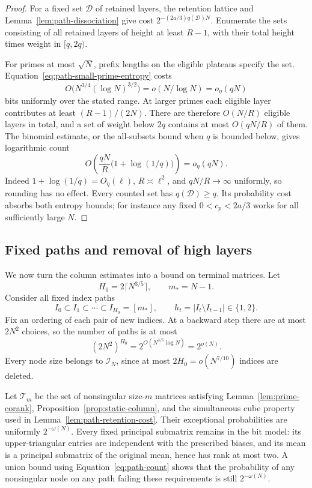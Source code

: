 \begin{proof}
For a fixed set \(\mathcal D\) of retained layers, the retention
lattice and Lemma~\ref{lem:path-dissociation} give cost
\(2^{-(2a/3)q(\mathcal D)N}\). Enumerate the sets consisting of
all retained layers of height at least \(R-1\), with their total
height times weight in \([q,2q)\).

For primes at most \(\sqrt N\), prefix lengths on the eligible
plateaus specify the set. Equation~\eqref{eq:path-small-prime-entropy}
costs
\[
 O\bigl(N^{3/4}(\log N)^{3/2}\bigr)
       =o(N/\log N)=o_\eta(qN)
\]
bits uniformly over the stated range. At larger primes each eligible
layer contributes at least \((R-1)/(2N)\). There are therefore
\(O(N/R)\) eligible layers in total, and a set of weight below
\(2q\) contains at most \(O(qN/R)\) of them. The binomial estimate,
or the all-subsets bound when \(q\) is bounded below, gives logarithmic
count
\[
 O\!\left(\frac{qN}{R}\bigl(1+\log(1/q)\bigr)\right)
       =o_\eta(qN).
\]
Indeed \(1+\log(1/q)=O_\eta(\ell)\), \(R\asymp\ell^2\),
and \(qN/R\to\infty\) uniformly, so rounding has no effect.
Every counted set has \(q(\mathcal D)\ge q\). Its probability
cost absorbs both entropy bounds; for instance any fixed
\(0<c_p<2a/3\) works for all sufficiently large \(N\).
\end{proof}

\subsection{Fixed paths and removal of high layers}

We now turn the column estimates into a bound on terminal matrices.
Let
\[
 H_0=2\lceil N^{3/5}\rceil,\qquad m_*=N-1.
\]
Consider all fixed index paths
\begin{equation}\label{eq:path-index-path}
 I_0\subset I_1\subset\cdots\subset I_{H_0}=[m_*],
 \qquad h_t=|I_t\setminus I_{t-1}|\in\{1,2\}.
\end{equation}
Fix an ordering of each pair of new indices. At a backward step there
are at most \(2N^2\) choices, so the number of paths is at most
\begin{equation}\label{eq:path-count}
 (2N^2)^{H_0}=2^{O(N^{3/5}\log N)}=2^{o(N)}.
\end{equation}
Every node size belongs to \(\mathcal I_N\), since at most
\(2H_0=o(N^{7/10})\) indices are deleted.

Let \(\mathcal T_m\) be the set of nonsingular size-\(m\) matrices
satisfying Lemma~\ref{lem:prime-corank},
Proposition~\ref{prop:static-column}, and the simultaneous cube
property used in Lemma~\ref{lem:path-retention-cost}.
Their exceptional probabilities are uniformly \(2^{-\omega(N)}\).
Every fixed principal submatrix remains in the bit model: its
upper-triangular entries are independent with the prescribed biases,
and its mean is a principal submatrix of the original mean, hence
has rank at most two.
A union bound using Equation~\eqref{eq:path-count} shows that the
probability of any nonsingular node on any path failing these
requirements is still \(2^{-\omega(N)}\).

